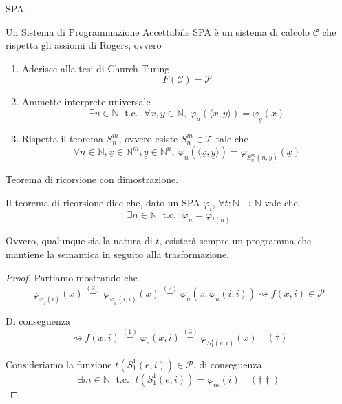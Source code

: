 \documentclass[12pt, answers]{exam}
\theoremstyle{plain}
\newcommand{\tc}{\; \text{ t.c. } \;}
\newcommand{\C}{\mathcal{C}}
\newcommand{\cp}{\mathcal{P}}
\newcommand{\T}{\mathcal{T}}
\newcommand{\N}{\mathbb{N}}
\begin{document}
\begin{questions}
        \question SPA.
        
        \begin{solution}
            Un Sistema di Programmazione Accettabile SPA è un sistema di calcolo $\C$ che rispetta gli assiomi di Rogers, ovvero
            \begin{enumerate}
                \item Aderisce alla tesi di Church-Turing
                $$ F(\C) = \cp $$
                
                \item Ammette interprete universale
                $$ \exists u \in \N \tc \forall x,y \in \N, \ \varphi_u (\langle x,y \rangle) = \varphi_y (x) $$
                
                \item Rispetta il teorema $S^m_n$, ovvero esiste $S^m_n \in \T$ tale che
                $$ \forall n \in \N, \underline{x} \in \N^m, \underline{y} \in \N^n, \ \varphi_n (\langle \underline{x}, \underline{y} \rangle) = \varphi_{S^m_n (n, \underline{y})} (\underline{x}) $$
            \end{enumerate}
        \end{solution}
        
        \question Teorema di ricorsione con dimostrazione.
        
        \begin{solution}
            Il teorema di ricorsione dice che, dato un SPA $\varphi_i$, $\forall t: \N \rightarrow \N$ vale che
            $$ \exists n \in \N \tc \varphi_n = \varphi_{t(n)} $$
            
            Ovvero, qualunque sia la natura di $t$, esisterà sempre un programma che mantiene la semantica in seguito alla trasformazione.
            
            \begin{proof}
                Partiamo mostrando che
                $$ \varphi_{\varphi_i (i)} (x) \stackrel{(2)}{=} \varphi_{\varphi_u (i,i)} (x) \stackrel{(2)}{=} \varphi_u (x, \varphi_u (i, i)) \rightsquigarrow f(x, i) \in \cp $$
                
                Di conseguenza
                $$ \rightsquigarrow f(x,i) \stackrel{(1)}{=} \varphi_e (x, i) \stackrel{(3)}{=} \varphi_{S^1_1 (e, i)} (x) \quad (\dag)$$
                
                Consideriamo la funzione $t\left(S^1_1 (e,i)\right) \in \cp$, di conseguenza
                $$ \exists m \in \N \tc t \left(S^1_1 (e, i) \right) = \varphi_m (i) \quad (\dag \dag) $$
                

\end{proof}
\end{solution}
\end{questions}
\end{document}

